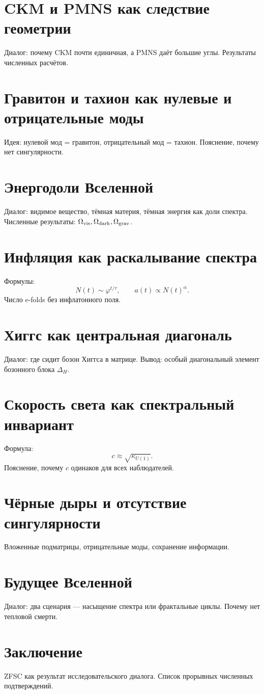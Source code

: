 \documentclass[12pt,a4paper]{article}
\begin{document}
\section{CKM и PMNS как следствие геометрии}
Диалог: почему CKM почти единичная, а PMNS даёт большие углы.
Результаты численных расчётов.

\section{Гравитон и тахион как нулевые и отрицательные моды}
Идея: нулевой мод = гравитон, отрицательный мод = тахион.
Пояснение, почему нет сингулярности.

\section{Энергодоли Вселенной}
Диалог: видимое вещество, тёмная материя, тёмная энергия как доли спектра.
Численные результаты: $\Omega_{\rm vis},\Omega_{\rm dark},\Omega_{\rm grav}$.

\section{Инфляция как раскалывание спектра}
Формулы:
\[
N(t) \sim \varphi^{t/\tau}, \qquad a(t)\propto N(t)^\alpha.
\]
Число e-folds без инфлатонного поля.

\section{Хиггс как центральная диагональ}
Диалог: где сидит бозон Хиггса в матрице.
Вывод: особый диагональный элемент бозонного блока $\Delta_H$.

\section{Скорость света как спектральный инвариант}
Формула:
\[
c \approx \sqrt{\kappa_{U(1)}}.
\]
Пояснение, почему $c$ одинаков для всех наблюдателей.

\section{Чёрные дыры и отсутствие сингулярности}
Вложенные подматрицы, отрицательные моды, сохранение информации.

\section{Будущее Вселенной}
Диалог: два сценария — насыщение спектра или фрактальные циклы.
Почему нет тепловой смерти.

\section{Заключение}
ZFSC как результат исследовательского диалога.
Список прорывных численных подтверждений.
\end{document}
